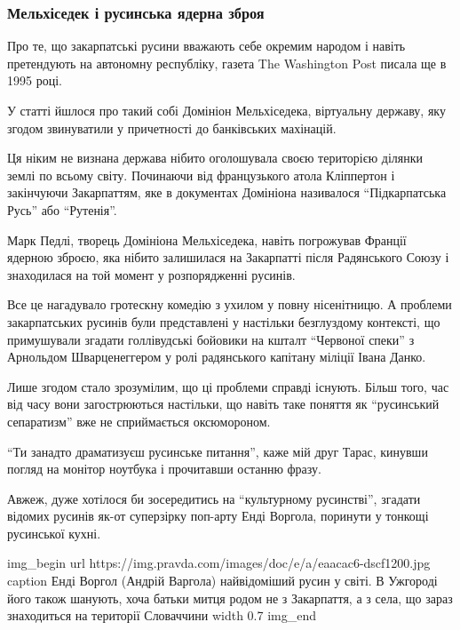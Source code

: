  
 
 

\subsubsection{Мельхіседек і русинська ядерна зброя}

Про те, що закарпатські русини вважають себе окремим народом і навіть
претендують на автономну республіку, газета The Washington Post писала ще в
1995 році.

У статті йшлося про такий собі Домініон Мельхіседека, віртуальну державу, яку
згодом звинуватили у причетності до банківських махінацій.

Ця ніким не визнана держава нібито оголошувала своєю територією ділянки землі
по всьому світу. Починаючи від французького атола Кліппертон і закінчуючи
Закарпаттям, яке в документах Домініона називалося \enquote{Підкарпатська Русь} або
\enquote{Рутенія}.

Марк Педлі, творець Домініона Мельхіседека, навіть погрожував Франції ядерною
зброєю, яка нібито залишилася на Закарпатті після Радянського Союзу і
знаходилася на той момент у розпорядженні русинів.

Все це нагадувало гротескну комедію з ухилом у повну нісенітницю. А проблеми
закарпатських русинів були представлені у настільки безглуздому контексті, що
примушували згадати голлівудські бойовики на кшталт \enquote{Червоної спеки} з
Арнольдом Шварценеггером у ролі радянського капітану міліції Івана Данко. 

Лише згодом стало зрозумілим, що ці проблеми справді існують. Більш того, час
від часу вони загострюються настільки, що навіть таке поняття як \enquote{русинський
сепаратизм} вже не сприймається оксюмороном.

\enquote{Ти занадто драматизуєш русинське питання}, \dshM каже мій друг Тарас, кинувши
погляд на монітор ноутбука і прочитавши останню фразу.

Авжеж, дуже хотілося би зосередитись на \enquote{культурному русинстві}, згадати
відомих русинів як-от суперзірку поп-арту Енді Воргола, поринути у тонкощі
русинської кухні.

\ifcmt
img_begin 
    url https://img.pravda.com/images/doc/e/a/eaacac6-dscf1200.jpg
    caption Енді Воргол (Андрій Варгола) \dshM найвідоміший русин у світі. В Ужгороді його також шанують, хоча батьки митця родом не з Закарпаття, а з села, що зараз знаходиться на території Словаччини
    width 0.7
img_end
\fi

